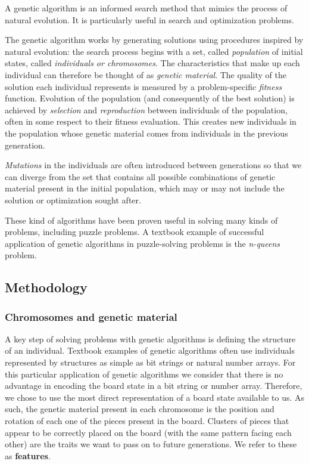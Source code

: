 \documentclass{llncs}
\begin{document}
A genetic algorithm is an informed search method that mimics the process of natural evolution. It is particularly useful in search and optimization problems.

The genetic algorithm works by generating solutions using procedures inspired by natural evolution: the search process begins with a set, called \textit{population} of initial states, called \textit{individuals or chromosomes}. The characteristics that make up each individual can therefore be thought of as \textit{genetic material}. The quality of the solution each individual represents is measured by a problem-specific \textit{fitness} function. Evolution of the population (and consequently of the best solution) is achieved by \textit{selection} and \textit{reproduction} between individuals of the population, often in some respect to their fitness evaluation. This creates new individuals in the population whose genetic material comes from individuals in the previous generation.\cite{peck_dhawan}

\textit{Mutations} in the individuals are often introduced between generations so that we can diverge from the set that contains all possible combinations of genetic material present in the initial population, which may or may not include the solution or optimization sought after.

These kind of algorithms have been proven useful in solving many kinds of problems, including puzzle problems. A textbook example of successful application of genetic algorithms in puzzle-solving problems is the \textit{n-queens} problem\cite{eastridge}.

\subsection{Methodology}\label{sec:methodology}

\subsubsection{Chromosomes and genetic material}

A key step of solving problems with genetic algorithms is defining the structure of an individual. Textbook examples of genetic algorithms often use individuals represented by structures as simple as bit strings or natural number arrays. For this particular application of genetic algorithms we consider that there is no advantage in encoding the board state in a bit string or number array. Therefore, we chose to use the most direct representation of a board state available to us. As such, the genetic material present in each chromosome is the position and rotation of each one of the pieces present in the board. Clusters of pieces that appear to be correctly placed on the board (with the same pattern facing each other) are the traits we want to pass on to future generations. We refer to these as \textbf{features}.
\end{document}
